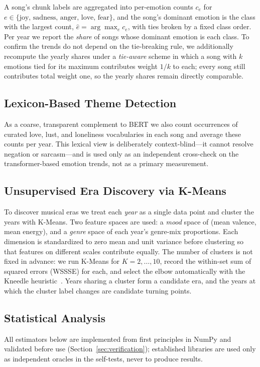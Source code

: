 \documentclass[conference]{IEEEtran}
\begin{document}
A song's chunk labels are aggregated into per-emotion counts $c_e$ for
$e \in \{\text{joy, sadness, anger, love, fear}\}$, and the song's dominant
emotion is the class with the largest count, $\hat{e} = \arg\max_e c_e$, with
ties broken by a fixed class order. Per year we report the \emph{share} of songs
whose dominant emotion is each class. To confirm the trends do not depend on the
tie-breaking rule, we additionally recompute the yearly shares under a
\emph{tie-aware} scheme in which a song with $k$ emotions tied for its maximum
contributes weight $1/k$ to each; every song still contributes total weight one,
so the yearly shares remain directly comparable.

\subsection{Lexicon-Based Theme Detection}
As a coarse, transparent complement to BERT we also count occurrences of curated
love, lust, and loneliness vocabularies in each song and average these counts
per year. This lexical view is deliberately context-blind---it cannot resolve
negation or sarcasm---and is used only as an independent cross-check on the
transformer-based emotion trends, not as a primary measurement.

\subsection{Unsupervised Era Discovery via K-Means}
To discover musical eras we treat each \emph{year} as a single data point and
cluster the years with K-Means. Two feature spaces are used: a \emph{mood} space
of (mean valence, mean energy), and a \emph{genre} space of each year's
genre-mix proportions. Each dimension is standardized to zero mean and unit
variance before clustering so that features on different scales contribute
equally. The number of clusters is not fixed in advance: we run K-Means for
$K = 2,\dots,10$, record the within-set sum of squared errors (WSSSE) for each,
and select the elbow automatically with the Kneedle heuristic~\cite{b_kneedle}.
Years sharing a cluster form a candidate era, and the years at which the cluster
label changes are candidate turning points.

\subsection{Statistical Analysis}
All estimators below are implemented from first principles in NumPy and
validated before use (Section~\ref{sec:verification}); established libraries are
used only as independent oracles in the self-tests, never to produce results.
\end{document}
